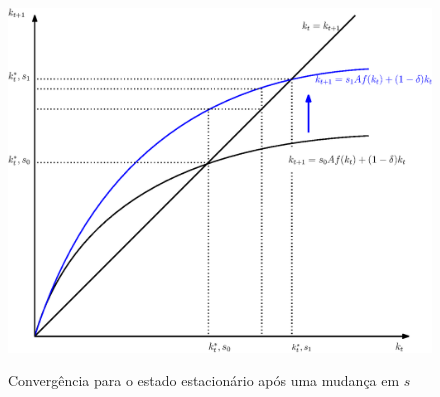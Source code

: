 \documentclass[11pt,a4paper]{article}
\begin{document}
\begin{figure}[!h]
\centering
\caption{Convergência para o estado estacionário após uma mudança em $s$} \vspace{2ex}
\includegraphics[scale=.5]{solow03.eps}
\label{fig:convergencia2}
\end{figure}





 
\end{document}
